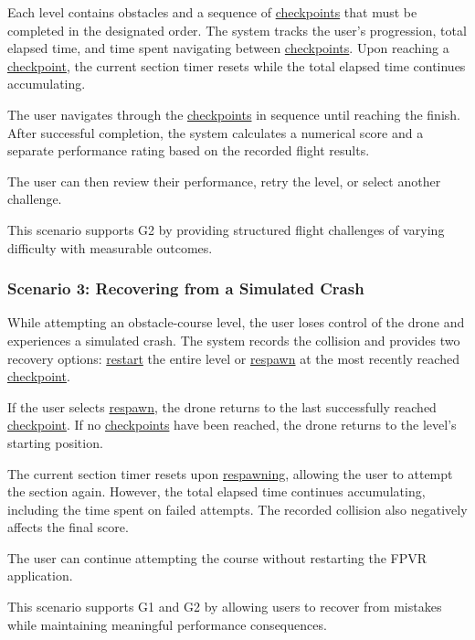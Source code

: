 \documentclass[12pt]{article}
\begin{document}
Each level contains obstacles and a sequence of \hyperlink{glos:Checkpoint}{checkpoints}
that must be completed in the designated order. The system
tracks the user's progression, total elapsed time, and time
spent navigating between \hyperlink{glos:Checkpoint}{checkpoints}. Upon reaching a
\hyperlink{glos:Checkpoint}{checkpoint}, the current section timer resets while the
total elapsed time continues accumulating.

The user navigates through the \hyperlink{glos:Checkpoint}{checkpoints} in sequence
until reaching the finish. After successful completion,
the system calculates a numerical score and a separate
performance rating based on the recorded flight results.

The user can then review their performance, retry the
level, or select another challenge.

This scenario supports G2 by providing structured flight
challenges of varying difficulty with measurable outcomes.


\subsubsection{Scenario 3: Recovering from a Simulated Crash}

While attempting an obstacle-course level, the user loses
control of the drone and experiences a simulated crash.
The system records the collision and provides two recovery
options: \hyperlink{glos:Respawn}{restart} the entire level or \hyperlink{glos:Respawn}{respawn} at the most
recently reached \hyperlink{glos:Checkpoint}{checkpoint}.

If the user selects \hyperlink{glos:Respawn}{respawn}, the drone returns to the last
successfully reached \hyperlink{glos:Checkpoint}{checkpoint}. If no \hyperlink{glos:Checkpoint}{checkpoints} have
been reached, the drone returns to the level's starting
position.

The current section timer resets upon \hyperlink{glos:Respawn}{respawning}, allowing
the user to attempt the section again. However, the total
elapsed time continues accumulating, including the time
spent on failed attempts. The recorded collision also
negatively affects the final score.

The user can continue attempting the course without
restarting the FPVR application.

This scenario supports G1 and G2 by allowing users to
recover from mistakes while maintaining meaningful
performance consequences.
\end{document}
